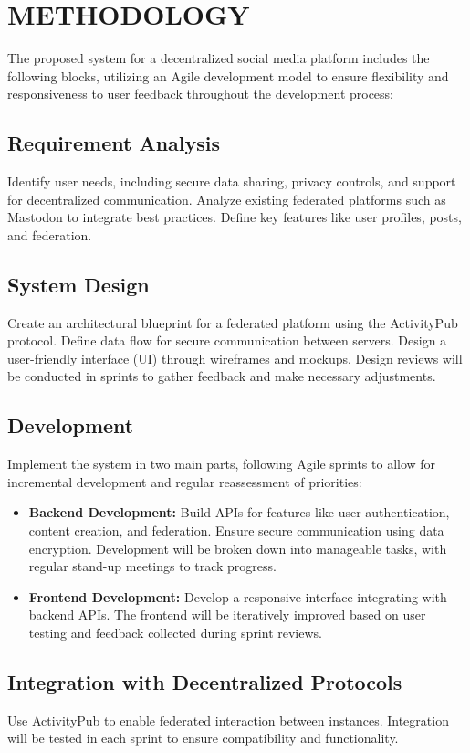 \chapter{METHODOLOGY}

The proposed system for a decentralized social media platform includes the following blocks, utilizing an Agile development model to ensure flexibility and responsiveness to user feedback throughout the development process:

\section{Requirement Analysis}
Identify user needs, including secure data sharing, privacy controls, and support for decentralized communication. Analyze existing federated platforms such as Mastodon to integrate best practices. Define key features like user profiles, posts, and federation.

\section{System Design}
Create an architectural blueprint for a federated platform using the ActivityPub protocol. Define data flow for secure communication between servers. Design a user-friendly interface (UI) through wireframes and mockups. Design reviews will be conducted in sprints to gather feedback and make necessary adjustments.

\section{Development}
Implement the system in two main parts, following Agile sprints to allow for incremental development and regular reassessment of priorities:
\begin{itemize}
    \item \textbf{Backend Development:} Build APIs for features like user authentication, content creation, and federation. Ensure secure communication using data encryption. Development will be broken down into manageable tasks, with regular stand-up meetings to track progress.
    \item \textbf{Frontend Development:} Develop a responsive interface integrating with backend APIs. The frontend will be iteratively improved based on user testing and feedback collected during sprint reviews.
\end{itemize}

\section{Integration with Decentralized Protocols}
Use ActivityPub to enable federated interaction between instances. Integration will be tested in each sprint to ensure compatibility and functionality.

